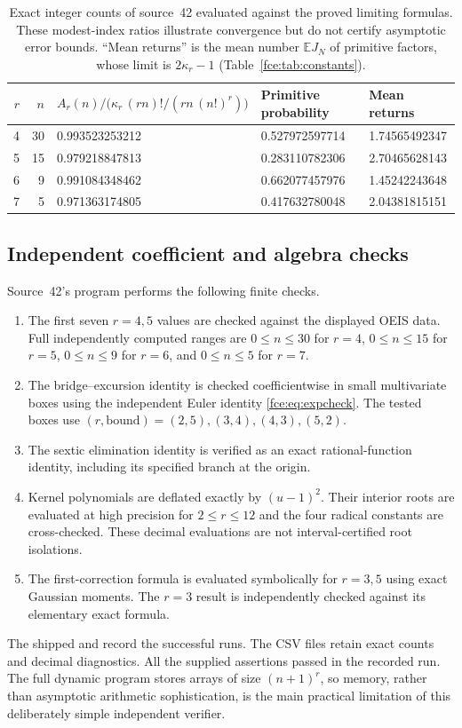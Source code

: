\documentclass[11pt,a4paper]{article}
\numberwithin{equation}{section}
\theoremstyle{definition}\newtheorem{definition}[theorem]{Definition}
\theoremstyle{remark}\newtheorem{remark}[theorem]{Remark}
\newcommand{\Exp}{\mathbb E}
\begin{document}
\begin{table}[ht]
\centering\small
\begin{tabular}{rrlll}
\toprule
$r$&$n$&$A_r(n)\big/\bigl(\kappa_r\,(rn)!/(rn\,(n!)^r)\bigr)$&Primitive probability&Mean returns\\
\midrule
4&30&0.993523253212&0.527972597714&1.74565492347\\
5&15&0.979218847813&0.283110782306&2.70465628143\\
6&9&0.991084348462&0.662077457976&1.45242243648\\
7&5&0.971363174805&0.417632780048&2.04381815151\\
\bottomrule
\end{tabular}
\caption{Exact integer counts of source~42 evaluated against the proved
limiting formulas. These modest-index ratios illustrate convergence but do
not certify asymptotic error bounds. ``Mean returns'' is the mean number
$\Exp J_N$ of primitive factors, whose limit is $2\kappa_r-1$
(Table~\ref{fce:tab:constants}).}\label{fce:lg:tab:checks}
\end{table}

\subsection{Independent coefficient and algebra checks}
Source~42's program performs the following finite checks.
\begin{enumerate}[label=(\alph*)]
\item The first seven $r=4,5$ values are checked against the displayed OEIS
data. Full independently computed ranges are $0\le n\le30$ for $r=4$,
$0\le n\le15$ for $r=5$, $0\le n\le9$ for $r=6$, and $0\le n\le5$ for $r=7$.
\item The bridge--excursion identity is checked coefficientwise in small
multivariate boxes using the independent Euler identity \eqref{fce:eq:expcheck}.
The tested boxes use $(r,\text{bound})=(2,5),(3,4),(4,3),(5,2)$.
\item The sextic elimination identity is verified as an exact
rational-function identity, including its specified branch at the origin.
\item Kernel polynomials are deflated exactly by $(u-1)^2$. Their interior
roots are evaluated at high precision for $2\le r\le12$ and the four
radical constants are cross-checked. These decimal evaluations are not
interval-certified root isolations.
\item The first-correction formula is evaluated symbolically for $r=3,5$
using exact Gaussian moments. The $r=3$ result is independently checked
against its elementary exact formula.
\end{enumerate}
The shipped  and
 record the successful
runs. The CSV files retain exact counts and decimal diagnostics. All the
supplied assertions passed in the recorded run. The full dynamic program
stores arrays of size $(n+1)^r$, so memory, rather than asymptotic
arithmetic sophistication, is the main practical limitation of this
deliberately simple independent verifier.
\end{document}
